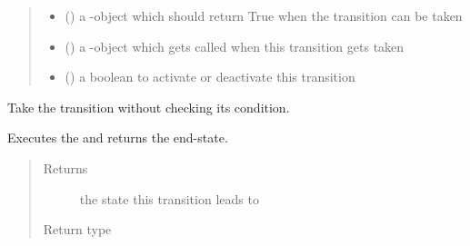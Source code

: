 \documentclass[a4paper,12pt,english]{article}
\begin{document}
\begin{fulllineitems}
\begin{quote}
\begin{description}
\begin{itemize}
\item {} 
 (\sphinxstyleliteralemphasis{\sphinxupquote{{[}}}\sphinxstyleliteralemphasis{\sphinxupquote{{[}}}\sphinxstyleliteralemphasis{\sphinxupquote{{]}}}\sphinxstyleliteralemphasis{\sphinxupquote{, }}\sphinxstyleliteralemphasis{\sphinxupquote{{]}}}) \textendash{} a -object which should return True when the transition can be
taken

\item {} 
 (\sphinxstyleliteralemphasis{\sphinxupquote{{[}}}\sphinxstyleliteralemphasis{\sphinxupquote{{[}}}\sphinxstyleliteralemphasis{\sphinxupquote{{]}}}\sphinxstyleliteralemphasis{\sphinxupquote{, }}\sphinxstyleliteralemphasis{\sphinxupquote{{]}}}) \textendash{} a -object which gets called when this transition gets taken

\item {} 
 () \textendash{} a boolean to activate or deactivate this transition

\end{itemize}

\end{description}\end{quote}

\begin{fulllineitems}
\label{\detokenize{osbk_operation:osbk_operation.utility.Transition.force_take}}
Take the transition without checking its condition.

Executes the  and returns the end-state.
\begin{quote}\begin{description}
\item[{Returns}] \leavevmode
the state this transition leads to

\item[{Return type}] \leavevmode
{\hyperref[\detokenize{osbk_operation:osbk_operation.utility.State}]{}}


\end{description}
\end{quote}
\end{fulllineitems}
\end{fulllineitems}
\end{document}
